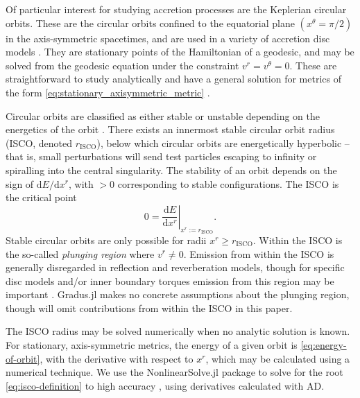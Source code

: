 \documentclass[fleqn,usenatbib]{mnras}
\newcommand{\software}[1]{{\sc #1}}
\newcommand{\Gradus}{\software{Gradus.jl}\xspace}
\renewcommand{\d}{\text{d}}
\newcommand{\risco}{r_\text{ISCO}}
\begin{document}
Of particular interest for studying accretion processes are the Keplerian
circular orbits. These are the circular orbits confined to the equatorial plane $(x^\theta = \pi/2)$
in the axis-symmetric spacetimes, and are used in a variety of accretion disc models
\citep{shakura_black_1973, sadowski_relativistic_2011}. They are stationary
points of the Hamiltonian of a geodesic, and may be solved from the geodesic
equation under the constraint $v^r = v^\theta = 0$. These are straightforward to
study analytically and have a general solution for metrics of the form
\eqref{eq:stationary_axisymmetric_metric} \citep[see e.g.][and
an extension towards $a^\mu \neq 0$ in Appendix
\ref{appendix:circular-orbits}]{johannsen_regular_2013}.

Circular orbits are classified as either stable or unstable depending on the
energetics of the orbit \citep{wilkins_bound_1972,bardeen_rotating_1972}. There
exists an innermost stable circular orbit radius (ISCO, denoted $\risco$), below
which circular orbits are energetically hyperbolic -- that is, small
perturbations will send test particles escaping to infinity or spiralling into
the central singularity. The stability of an orbit depends on the sign of $\d E
/ \d x^r$, with $>0$ corresponding to stable configurations. The ISCO is the
critical point
\begin{equation}
    \label{eq:isco-definition}
    0 = \left. \frac{\d E}{\d x^r} \right\rvert_{x^r := \risco}.
\end{equation}
Stable circular orbits are only possible for radii $x^r \geq \risco$. Within the
ISCO is the so-called \textit{plunging region} where $v^r \neq 0$. Emission from
within the ISCO is generally disregarded in reflection and reverberation models,
though for specific disc models and/or inner boundary torques emission from this
region may be important \citep[see e.g.][]{reynolds_isco_1997,young_isco_1998,
mummery_continuum_2024}. \Gradus makes no concrete assumptions about the
plunging region, though will omit contributions from within the ISCO in this
paper.

The ISCO radius may be solved numerically when no analytic solution is known.
For stationary, axis-symmetric metrics, the energy of a given orbit is
\eqref{eq:energy-of-orbit}, with the derivative with respect to $x^r$, which may
be calculated using a numerical technique. We use the NonlinearSolve.jl package
to solve for the root \eqref{eq:isco-definition} to high accuracy
\citep{Pal_NonlinearSolve_jl_2023}, using derivatives calculated with AD.
\end{document}
